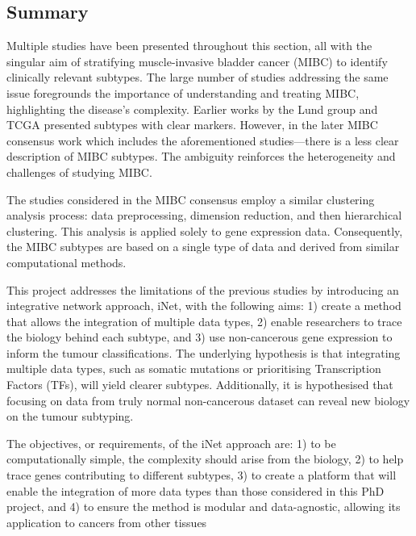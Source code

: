 \subsection{Summary}

Multiple studies have been presented throughout this section, all with the singular aim of stratifying muscle-invasive bladder cancer (MIBC) to identify clinically relevant subtypes. The large number of studies addressing the same issue foregrounds the importance of understanding and treating MIBC, highlighting the disease's complexity. Earlier works by the Lund group \citep{Sjodahl2017-xr,Marzouka2018-ge} and TCGA \citep{Tcga2014-dr,Robertson2017-mg} presented subtypes with clear markers. However, in the later MIBC consensus work \citep{Kamoun2020-tj} which includes the aforementioned studies—there is a less clear description of MIBC subtypes. The ambiguity reinforces the heterogeneity and challenges of studying MIBC.

The studies considered in the MIBC consensus employ a similar clustering analysis process: data preprocessing, dimension reduction, and then hierarchical clustering. This analysis is applied solely to gene expression data. Consequently, the MIBC subtypes are based on a single type of data and derived from similar computational methods.

This project addresses the limitations of the previous studies by introducing an integrative network approach, iNet, with the following aims: 1) create a method that allows the integration of multiple data types, 2) enable researchers to trace the biology behind each subtype, and 3) use non-cancerous gene expression to inform the tumour classifications. The underlying hypothesis is that integrating multiple data types, such as somatic mutations or prioritising Transcription Factors (TFs), will yield clearer subtypes. Additionally, it is hypothesised that focusing on data from truly normal non-cancerous dataset can reveal new biology on the tumour subtyping.

The objectives, or requirements, of the iNet approach are: 1) to be computationally simple, the complexity should arise from the biology, 2) to help trace genes contributing to different subtypes, 3) to create a platform that will enable the integration of more data types than those considered in this PhD project, and 4) to ensure the method is modular and data-agnostic, allowing its application to cancers from other tissues


